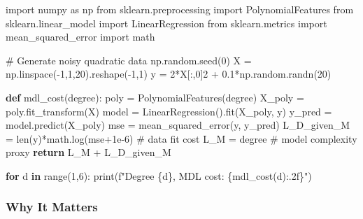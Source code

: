 \documentclass[
  letterpaper,
  DIV=11,
  numbers=noendperiod]{scrreprt}
\newenvironment{Shaded}{\begin{snugshade}}{\end{snugshade}}
\newcommand{\BuiltInTok}[1]{\textcolor[rgb]{0.00,0.23,0.31}{#1}}
\newcommand{\CommentTok}[1]{\textcolor[rgb]{0.37,0.37,0.37}{#1}}
\newcommand{\ControlFlowTok}[1]{\textcolor[rgb]{0.00,0.23,0.31}{\textbf{#1}}}
\newcommand{\DecValTok}[1]{\textcolor[rgb]{0.68,0.00,0.00}{#1}}
\newcommand{\FloatTok}[1]{\textcolor[rgb]{0.68,0.00,0.00}{#1}}
\newcommand{\ImportTok}[1]{\textcolor[rgb]{0.00,0.46,0.62}{#1}}
\newcommand{\KeywordTok}[1]{\textcolor[rgb]{0.00,0.23,0.31}{\textbf{#1}}}
\newcommand{\NormalTok}[1]{\textcolor[rgb]{0.00,0.23,0.31}{#1}}
\newcommand{\OperatorTok}[1]{\textcolor[rgb]{0.37,0.37,0.37}{#1}}
\newcommand{\SpecialCharTok}[1]{\textcolor[rgb]{0.37,0.37,0.37}{#1}}
\newcommand{\SpecialStringTok}[1]{\textcolor[rgb]{0.13,0.47,0.30}{#1}}
\begin{document}
\begin{Shaded}
\begin{Highlighting}[]
\ImportTok{import}\NormalTok{ numpy }\ImportTok{as}\NormalTok{ np}
\ImportTok{from}\NormalTok{ sklearn.preprocessing }\ImportTok{import}\NormalTok{ PolynomialFeatures}
\ImportTok{from}\NormalTok{ sklearn.linear\_model }\ImportTok{import}\NormalTok{ LinearRegression}
\ImportTok{from}\NormalTok{ sklearn.metrics }\ImportTok{import}\NormalTok{ mean\_squared\_error}
\ImportTok{import}\NormalTok{ math}

\CommentTok{\# Generate noisy quadratic data}
\NormalTok{np.random.seed(}\DecValTok{0}\NormalTok{)}
\NormalTok{X }\OperatorTok{=}\NormalTok{ np.linspace(}\OperatorTok{{-}}\DecValTok{1}\NormalTok{,}\DecValTok{1}\NormalTok{,}\DecValTok{20}\NormalTok{).reshape(}\OperatorTok{{-}}\DecValTok{1}\NormalTok{,}\DecValTok{1}\NormalTok{)}
\NormalTok{y }\OperatorTok{=} \DecValTok{2}\OperatorTok{*}\NormalTok{X[:,}\DecValTok{0}\NormalTok{]}\DecValTok{2} \OperatorTok{+} \FloatTok{0.1}\OperatorTok{*}\NormalTok{np.random.randn(}\DecValTok{20}\NormalTok{)}

\KeywordTok{def}\NormalTok{ mdl\_cost(degree):}
\NormalTok{    poly }\OperatorTok{=}\NormalTok{ PolynomialFeatures(degree)}
\NormalTok{    X\_poly }\OperatorTok{=}\NormalTok{ poly.fit\_transform(X)}
\NormalTok{    model }\OperatorTok{=}\NormalTok{ LinearRegression().fit(X\_poly, y)}
\NormalTok{    y\_pred }\OperatorTok{=}\NormalTok{ model.predict(X\_poly)}
\NormalTok{    mse }\OperatorTok{=}\NormalTok{ mean\_squared\_error(y, y\_pred)}
\NormalTok{    L\_D\_given\_M }\OperatorTok{=} \BuiltInTok{len}\NormalTok{(y)}\OperatorTok{*}\NormalTok{math.log(mse}\OperatorTok{+}\FloatTok{1e{-}6}\NormalTok{)   }\CommentTok{\# data fit cost}
\NormalTok{    L\_M }\OperatorTok{=}\NormalTok{ degree                              }\CommentTok{\# model complexity proxy}
    \ControlFlowTok{return}\NormalTok{ L\_M }\OperatorTok{+}\NormalTok{ L\_D\_given\_M}

\ControlFlowTok{for}\NormalTok{ d }\KeywordTok{in} \BuiltInTok{range}\NormalTok{(}\DecValTok{1}\NormalTok{,}\DecValTok{6}\NormalTok{):}
    \BuiltInTok{print}\NormalTok{(}\SpecialStringTok{f"Degree }\SpecialCharTok{\{}\NormalTok{d}\SpecialCharTok{\}}\SpecialStringTok{, MDL cost: }\SpecialCharTok{\{}\NormalTok{mdl\_cost(d)}\SpecialCharTok{:.2f\}}\SpecialStringTok{"}\NormalTok{)}
\end{Highlighting}
\end{Shaded}

\subsubsection{Why It Matters}\label{why-it-matters-66}
\end{document}
